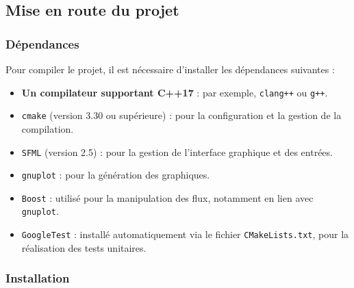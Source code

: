 \subsection{Mise en route du projet}\label{subsec:mise-en-route-du-projet}

\subsubsection{Dépendances}\label{subsubsec:dependances}
Pour compiler le projet, il est nécessaire d'installer les dépendances suivantes :
\begin{itemize}
    \item \textbf{Un compilateur supportant C++17} : par exemple, \texttt{clang++} ou \texttt{g++}.
    \item \texttt{cmake} (version 3.30 ou supérieure) : pour la configuration et la gestion de la compilation.
    \item \texttt{SFML} (version 2.5) : pour la gestion de l'interface graphique et des entrées.
    \item \texttt{\gls{gnuplot}} : pour la génération des graphiques.
    \item \texttt{Boost} : utilisé pour la manipulation des flux, notamment en lien avec \texttt{gnuplot}.
    \item \texttt{GoogleTest} : installé automatiquement via le fichier \texttt{CMakeLists.txt}, pour la réalisation des tests unitaires.
\end{itemize}

\subsubsection{Installation}\label{subsubsec:installation}
